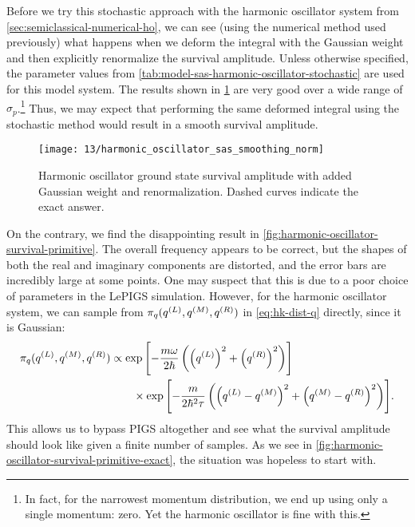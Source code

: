 Before we try this stochastic approach with the harmonic oscillator system from \cref{sec:semiclassical-numerical-ho}, we can see (using the numerical method used previously) what happens when we deform the integral with the Gaussian weight and then explicitly renormalize the survival amplitude.
Unless otherwise specified, the parameter values from \cref{tab:model-sas-harmonic-oscillator-stochastic} are used for this model system.
The results shown in \cref{fig:harmonic-oscillator-survival-smoothing-norm} are very good over a wide range of $\sigma_p$.\footnote{
	In fact, for the narrowest momentum distribution, we end up using only a single momentum: zero.
	Yet the harmonic oscillator is fine with this.
}
Thus, we may expect that performing the same deformed integral using the stochastic method would result in a smooth survival amplitude.

\begin{figure}
	\centering
	\texttt{[image: 13/harmonic\_oscillator\_sas\_smoothing\_norm]}
	\caption[
		Harmonic oscillator survival amplitude with added Gaussian weight
	]{
		Harmonic oscillator ground state survival amplitude with added Gaussian weight and renormalization.
		Dashed curves indicate the exact answer.
	}
	\label{fig:harmonic-oscillator-survival-smoothing-norm}
\end{figure}

On the contrary, we find the disappointing result in \cref{fig:harmonic-oscillator-survival-primitive}.
The overall frequency appears to be correct, but the shapes of both the real and imaginary components are distorted, and the error bars are incredibly large at some points.
One may suspect that this is due to a poor choice of parameters in the LePIGS simulation.
However, for the harmonic oscillator system, we can sample from $\pi_q(q^{(L)}, q^{(M)}, q^{(R)})$ in \cref{eq:hk-dist-q} directly, since it is Gaussian:
\begin{align}
	\pi_q(q^{(L)}, q^{(M)}, q^{(R)})
	&\propto \exp{\left[ 
			-\frac{m \omega}{2 \hbar} \left( \left( q^{(L)}\right)^2 + \left( q^{(R)}\right)^2 \right)
		 \right]} \notag \\
	&\qquad\times
		\exp{\left[ 
			-\frac{m}{2 \hbar^2 \tau} \left( \left( q^{(L)}- q^{(M)}\right)^2 + \left( q^{(M)}- q^{(R)}\right)^2 \right)
		 \right]}.
\end{align}
This allows us to bypass PIGS altogether and see what the survival amplitude should look like given a finite number of samples.
As we see in \cref{fig:harmonic-oscillator-survival-primitive-exact}, the situation was hopeless to start with.

